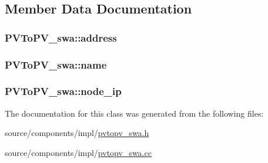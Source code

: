 \subsection{Member Data Documentation}
\hypertarget{classPVToPV__swa_f6614400b4aa4b0c920a2d0a567ce42d}{
\subsubsection[{address}]{ {\bf PVToPV\_\-swa::address}}}
\label{classPVToPV__swa_f6614400b4aa4b0c920a2d0a567ce42d}


\hypertarget{classPVToPV__swa_9f673d0307d5d7b038138abcc78da074}{
\subsubsection[{name}]{ {\bf PVToPV\_\-swa::name}}}
\label{classPVToPV__swa_9f673d0307d5d7b038138abcc78da074}


\hypertarget{classPVToPV__swa_081f3bfa27f295b8fa262cb9ffdc50fa}{
\subsubsection[{node\_\-ip}]{ {\bf PVToPV\_\-swa::node\_\-ip}}}
\label{classPVToPV__swa_081f3bfa27f295b8fa262cb9ffdc50fa}




The documentation for this class was generated from the following files:\begin{CompactItemize}
\item 
source/components/impl/\hyperlink{pvtopv__swa_8h}{pvtopv\_\-swa.h}\item 
source/components/impl/\hyperlink{pvtopv__swa_8cc}{pvtopv\_\-swa.cc}\end{CompactItemize}
